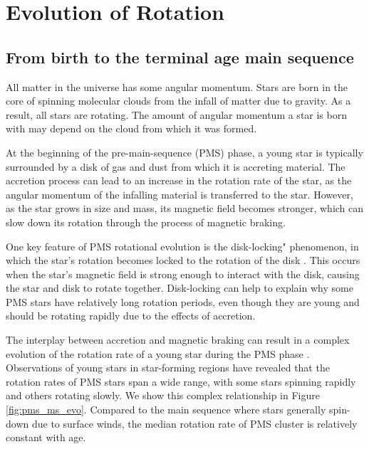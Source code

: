 \section{Evolution of Rotation}
\label{sec:evolution}


\subsection{From birth to the terminal age main sequence}

All matter in the universe has some angular momentum. 
Stars are born in the core of spinning molecular clouds from the infall of matter due to gravity. 
As a result, all stars are rotating.
The amount of angular momentum a star is born with may depend on the cloud from which it was formed.

At the beginning of the pre-main-sequence (PMS) phase, a young star is typically surrounded by a disk of gas and dust from which it is accreting material.
The accretion process can lead to an increase in the rotation rate of the star, as the angular momentum of the infalling material is transferred to the star.
However, as the star grows in size and mass, its magnetic field becomes stronger, which can slow down its rotation through the process of magnetic braking.

One key feature of PMS rotational evolution is the disk-locking" phenomenon, in which the star's rotation becomes locked to the rotation of the disk \citep{eggenberger_angular_2012}.
This occurs when the star's magnetic field is strong enough to interact with the disk, causing the star and disk to rotate together.
Disk-locking can help to explain why some PMS stars have relatively long rotation periods, even though they are young and should be rotating rapidly due to the effects of accretion.

The interplay between accretion and magnetic braking can result in a complex evolution of the rotation rate of a young star during the PMS phase \citep{gallet_improved_2013}.
Observations of young stars in star-forming regions have revealed that the rotation rates of PMS stars span a wide range, with some stars spinning rapidly and others rotating slowly.
We show this complex relationship in Figure \ref{fig:pms_ms_evo}.
Compared to the main sequence where stars generally spin-down due to surface winds, the median rotation rate of PMS cluster is relatively constant with age.

